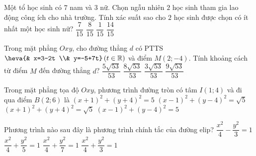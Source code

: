 \begin{ex}
 Một tổ học sinh có $7$ nam và $3$ nữ. Chọn ngẫu nhiên $2$ học sinh tham gia lao động công ích cho nhà trường. Tính xác suất sao cho $2$ học sinh được chọn có ít nhất một học sinh nữ?
\choice
{$\dfrac{7}{15}$}
{\True $\dfrac{8}{15}$}
{$\dfrac{1}{15}$}
{$\dfrac{14}{15}$}
\end{ex}
\begin{ex}
 Trong mặt phẳng $Oxy$, cho đường thẳng $d$ có PTTS$\heva{& x=3-2t \\& y=-5+7t}\left(t\in \mathbb{R}\right)$ và điểm $M(2;-4)$. Tính khoảng cách từ điểm $M$ đến đường thẳng $d$?
\choice
{\True $\dfrac{5\sqrt{53}}{53}$}
{$\dfrac{8\sqrt{53}}{53}$}
{$\dfrac{3\sqrt{53}}{53}$}
{$\dfrac{9\sqrt{53}}{53}$}
\end{ex}
\begin{ex}
Trong mặt phẳng tọa độ $Oxy$, phương trình đường tròn có tâm $I(1;4)$ và đi qua điểm $B(2;6)$ là
\choice
{$(x+1)^2+{{(y+4)}^2}=5$}
{${{(x-1)}^2}+{{(y-4)}^2}=\sqrt{5}$}
{${{(x+1)}^2}+{{(y+4)}^2}=\sqrt{5}$}
{\True ${{(x-1)}^2}+{{(y-4)}^2}=5$}
\end{ex}
\begin{ex}
 Phương trình nào sau đây là phương trình chính tắc của đường elip?
\choice
{$\dfrac{x^2}{4}-\dfrac{y^2}{3}=1$}
{$\dfrac{x^2}{4}+\dfrac{y^2}{5}=1$}
{$\dfrac{x^2}{4}+\dfrac{y^2}{7}=1$}
{\True $\dfrac{x^2}{4}+\dfrac{y^2}{3}=1$}
\end{ex}
